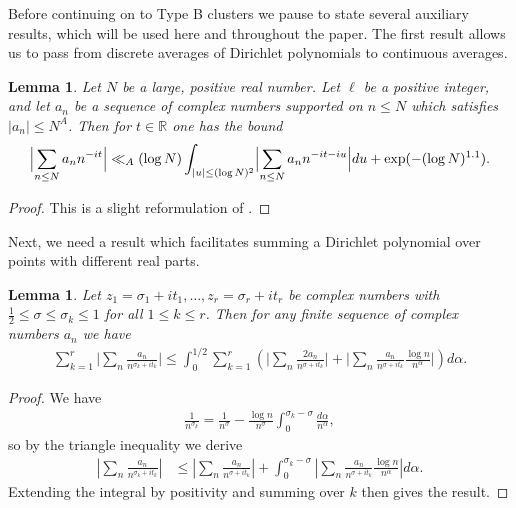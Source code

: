 \documentclass[12pt]{amsart}
\theoremstyle{plain}
\newtheorem{lemma}[theorem]{Lemma}
\theoremstyle{definition}
\theoremstyle{remark}
\begin{document}
%
%
%
%
Before continuing on to Type B clusters we pause to state several auxiliary results, which will be used here and throughout the paper. The first result allows us to pass from discrete averages of Dirichlet polynomials to continuous averages.
%
%
%
%
\begin{lemma}\label{lem:DiscreteToContinuous}
Let $N$ be a large, positive real number. Let $\ell$ be a positive integer, and let $a_n$ be a sequence of complex numbers supported on $n \leq N$ which satisfies $|a_n| \leq N^A$. Then for $t \in \mathbb{R}$ one has the bound
\begin{align*}
\Bigl|\sum_{n \leq N} a_n n^{-it}\Bigr| \ll_A (\log N)\int_{|u|\leq (\log N)^2} \Bigl|\sum_{n \leq N} a_n n^{-it-iu}\Bigr|du + \exp (-(\log N)^{1.1}).
\end{align*}
\end{lemma}
\begin{proof}
This is a slight reformulation of \cite[Lemma 4.48]{Bou2000}.
\end{proof}
%
%
%
%
Next, we need a result which facilitates summing a Dirichlet polynomial over points with different real parts.
%
%
%
%
\begin{lemma}\label{lem:RealPartsBiggerThanSigma}
Let $z_1 = \sigma_1 + it_1, \ldots, z_r = \sigma_r + it_r$ be complex numbers with $\frac{1}{2}\leq \sigma \leq \sigma_k\leq 1$ for all $1\leq k\leq r$. Then for any finite sequence of complex numbers $a_n$ we have
\begin{align*}
\sum_{k=1}^r \Big|\sum_{n} \frac{a_n}{n^{\sigma_k + it_k }} \Big| \leq \int_0^{1/2}\sum_{k=1}^r \left(\Big|\sum_{n} \frac{2a_n}{n^{\sigma + it_k }} \Big| + \Big|\sum_{n} \frac{a_n}{n^{\sigma + it_k }} \frac{\log n}{n^\alpha} \Big| \right) d\alpha.
\end{align*}
\end{lemma}
%
%
%
%
\begin{proof}
We have
\begin{align*}
\frac{1}{n^{\sigma_k}} = \frac{1}{n^\sigma} - \frac{\log n}{n^\sigma}\int_0^{\sigma_k-\sigma} \frac{d\alpha}{n^\alpha},
\end{align*}
so by the triangle inequality we derive
\begin{align*}
\left|\sum_{n} \frac{a_n}{n^{\sigma_k + it_k }} \right|&\leq \left|\sum_{n} \frac{a_n}{n^{\sigma + it_k }} \right| + \int_0^{\sigma_k-\sigma} \left|\sum_{n} \frac{a_n}{n^{\sigma + it_k }} \frac{\log n}{n^\alpha} \right| d\alpha.
\end{align*}
Extending the integral by positivity and summing over $k$ then gives the result.
\end{proof}
\end{document}
